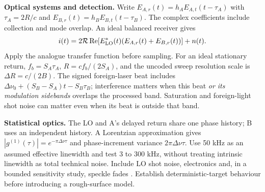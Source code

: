 \documentclass[10pt,letterpaper]{article}
\begin{document}
\textbf{Optical systems and detection.} Write $E_{A,r}(t)=h_AE_{A,t}(t-\tau_A)$ with $\tau_A=2R/c$ and $E_{B,r}(t)=h_BE_{B,t}(t-\tau_B)$. The complex coefficients include collection and mode overlap. An ideal balanced receiver gives
\begin{equation}
i(t)=2\mathcal R\operatorname{Re}\!\left[E_{\rm LO}^*(t)(E_{A,r}(t)+E_{B,r}(t))\right]+n(t).
\end{equation}
Apply the analogue transfer function before sampling. For an ideal stationary return, $f_b=S_A\tau_A$, $R=cf_b/(2S_A)$, and the uncoded sweep resolution scale is $\Delta R=c/(2B)$. The signed foreign-laser beat includes $\Delta\nu_0+(S_B-S_A)t-S_B\tau_B$; interference matters when this beat \emph{or its modulation sidebands} overlaps the processed band. Saturation and foreign-light shot noise can matter even when its beat is outside that band.

\textbf{Statistical optics.} The LO and A's delayed return share one phase history; B uses an independent history. A Lorentzian approximation gives $|g^{(1)}(\tau)|=e^{-\pi\Delta\nu\tau}$ and phase-increment variance $2\pi\Delta\nu\tau$. Use 50 kHz as an assumed effective linewidth and test 3 to 300 kHz, without treating intrinsic linewidth as total technical noise. Include LO shot noise, electronics and, in a bounded sensitivity study, speckle fades \cite{baumann}. Establish deterministic-target behaviour before introducing a rough-surface model.
\newpage
\end{document}
